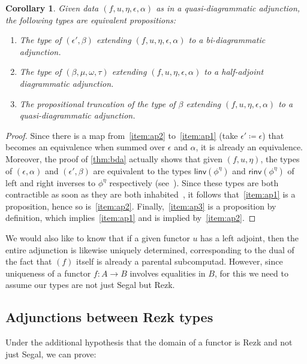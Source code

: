 \documentclass{amsart}
\theoremstyle{plain}
\newtheorem{cor}[thm]{Corollary}
\theoremstyle{definition}
\theoremstyle{remark}
\numberwithin{equation}{section}
\newcommand{\defeq}{\coloneqq}
\begin{document}
\begin{cor}\label{thm:alpha-parental}
  Given data $(f,u,\eta,\epsilon,\alpha)$ as in a quasi-diagrammatic adjunction, the following types are equivalent propositions:
  \begin{enumerate}[label=(\roman*)]
  \item The type of $(\epsilon',\beta)$ extending $(f,u,\eta,\epsilon,\alpha)$ to a bi-diagrammatic adjunction.\label{item:ap1}
  \item The type of $(\beta,\mu,\omega,\tau)$ extending $(f,u,\eta,\epsilon,\alpha)$ to a half-adjoint diagrammatic adjunction.\label{item:ap2}
  \item The propositional truncation of the type of $\beta$ extending $(f,u,\eta,\epsilon,\alpha)$ to a quasi-diagrammatic adjunction.\label{item:ap3}
  \end{enumerate}
\end{cor}
\begin{proof}
  Since there is a map from~\ref{item:ap2} to~\ref{item:ap1} (take $\epsilon'\defeq\epsilon$) that becomes an equivalence when summed over $\epsilon$ and $\alpha$, it is already an equivalence.
  Moreover, the proof of \cref{thm:bda} actually shows that given $(f,u,\eta)$, the types of $(\epsilon,\alpha)$ and $(\epsilon',\beta)$ are equivalent to the types $\mathsf{linv}(\phi^\eta)$ and $\mathsf{rinv}(\phi^\eta)$ of left and right inverses to $\phi^\eta$ respectively (see~\cite[Definition 4.2.7]{hottbook}).
  Since these types are both contractible as soon as they are both inhabited~\cite[Lemma 4.2.9]{hottbook}, it follows that~\ref{item:ap1} is a proposition, hence so is~\ref{item:ap2}.
  Finally,~\ref{item:ap3} is a proposition by definition, which implies~\ref{item:ap1} and is implied by~\ref{item:ap2}.
\end{proof}

We would also like to know that if a given functor $u$ has a left adjoint, then the entire adjunction is likewise uniquely determined, corresponding to the dual of the fact that $(f)$ itself is already a parental subcomputad.
However, since uniqueness of a functor $f:A\to B$ involves equalities in $B$, for this we need to assume our types are not just Segal but Rezk.


\subsection{Adjunctions between Rezk types}
\label{sec:adj-rezk}

Under the additional hypothesis that the domain of a functor is Rezk and not just Segal, we can prove:
\end{document}
